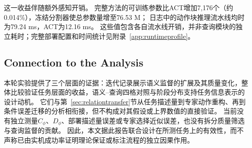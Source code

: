 这一收益伴随额外感知开销。
完整方法的可训练参数比ACT增加7,176个（约0.014\%），冻结分割器使总参数量增至76.53 M；
日志中的动作块推理流水线均时为79.24 ms，ACT为12.16 ms。
这些值包含各自流水线开销，并非查询模块的独立耗时；完整部署配置和时间统计见附录~\ref{app:runtimeprofile}。

\subsection{Connection to the Analysis}
\label{sec:experimentalevidence}
本轮实验提供了三个层面的证据：迭代记录展示语义监督的扩展及其质量变化，整体比较验证任务层面的收益，语义--查询四格对照与阶段分布支持任务信息表示的设计动机。
它们与第~\ref{sec:relationtransfer}节从任务描述量到专家动作重构、再到条件误差迁移的分析相衔接，但不构成对其假设或上界数值的直接验证。
当前没有独立测量$C_\phi$、$D_\phi$、部署描述量误差或专家选择近似误差，也没有拆分质量筛选与查询监督的贡献。
因此，本文据此报告联合设计在所测任务上的有效性，而不声称已由实机成功率证明理论保证或标注流程的独立因果作用。
